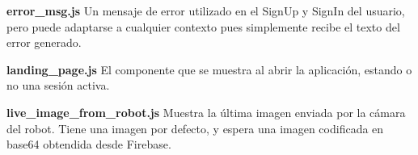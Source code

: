 \textbf{error\_msg.js}
\label{\detokenize{code_docs:error-msg-js}}
Un mensaje de error utilizado en el SignUp y SignIn del usuario, pero puede
adaptarse a cualquier contexto pues simplemente recibe el texto del error
generado.

%
\begin{sphinxVerbatim}[commandchars=\\\{\}]
     
     
\end{sphinxVerbatim}


\textbf{landing\_page.js}
\label{\detokenize{code_docs:landing-page-js}}
El componente que se muestra al abrir la aplicación, estando o no una sesión
activa.

%
\begin{sphinxVerbatim}[commandchars=\\\{\}]
    
   
     
\end{sphinxVerbatim}


\textbf{live\_image\_from\_robot.js}
\label{\detokenize{code_docs:live-image-from-robot-js}}
Muestra la última imagen enviada por la cámara del robot. Tiene una imagen por
defecto, y espera una imagen codificada en base64 obtendida desde Firebase.

